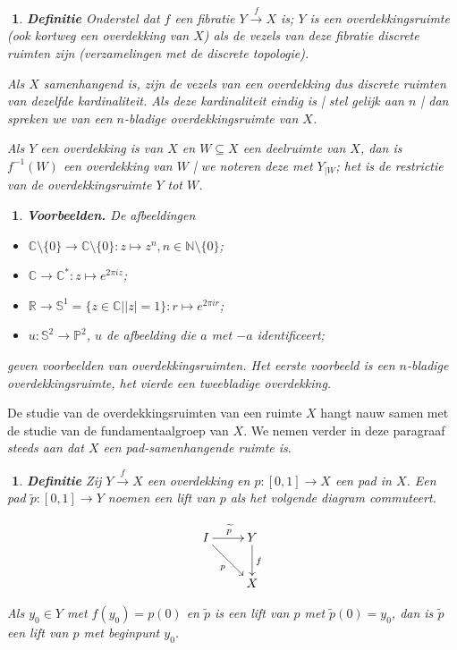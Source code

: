 \documentclass[12pt]{book}
\newcommand{\R}{\mathbb{R}}
\newcommand{\C}{\mathbb{C}}
\newtheorem{vbnh}[stelh]{$\!\!$}
\newenvironment{vbn}{\begin{vbnh} \em {\bf Voorbeelden.}}{\end{vbnh}}
\newtheorem{dfh}[stelh]{$\!\!$}
\newenvironment{df}{\begin{dfh} \em {\bf Definitie }}{\end{dfh}}
\begin{document}
\begin{df} Onderstel dat $f$ een fibratie $Y\stackrel{f}{\to} X$ is; $Y$ is een  {\em overdekkingsruimte} (ook kortweg een  {\em overdekking} van $X$) als de vezels van deze fibratie discrete ruimten  zijn (verzamelingen met de discrete topologie). 

Als $X$ samenhangend is, zijn de vezels van een overdekking dus discrete ruimten van dezelfde kardinaliteit. Als deze kardinaliteit eindig is | stel gelijk aan $n$ | dan spreken we van een $n$-{\em bladige overdekkingsruimte} van $X$.

Als $Y$ een overdekking is van $X$ en $W\subseteq X$ een deelruimte  van $X$, dan is $f^{-1}(W)$ een overdekking van $W$ | we noteren deze met $Y_{|W}$; het is de {\em restrictie} van de overdekkings\-ruimte $Y$ tot  $W$.
\end{df}

\begin{vbn} \label{overd} De afbeeldingen
\begin{itemize}
\item $\C\setminus\{0\} \to \C\setminus \{0\}: z\mapsto z^n, n\in \mathbb{N}\setminus\{0\}$;
\item $\C \to \C^{*}: z\mapsto e^{2\pi iz}$;
\item $\R \to\mathbb{S}^{1}= \{z\in \C||z|=1\}: r\mapsto e^{2\pi ir}$;
\item $u:\mathbb{S}^{2}\to \mathbb{P}^{2}$, $u$ de afbeelding die $a$ met $-a$ identificeert;
\end{itemize}
geven voorbeelden van overdekkingsruimten. Het eerste voorbeeld is een $n$-bladige overdek\-kingsruimte, het vierde een tweebladige overdekking.
\end{vbn}

De studie van de overdekkingsruimten van een ruimte $X$ hangt nauw samen met de studie van de fundamentaalgroep van $X$. 
We nemen verder in deze paragraaf {\em steeds aan dat $X$ een pad-samenhangende ruimte is}.

\begin{df} Zij $Y\stackrel{f}{\to} X$ een overdekking en $p:[0,1]\to X$ een pad in $X$. Een pad $\widetilde{p}:[0,1]\to Y$ noemen een  {\em lift} van $p$ als het volgende diagram commuteert.

$$\xymatrix{
I \ar[r]^{\widetilde{p}} \ar[rd]_p & Y \ar[d]^f \\
& X 
}$$


Als $y_0\in Y$ met $f(y_0)=p(0)$ en $\widetilde{p}$ is een lift van $p$ met $\widetilde{p}(0)=y_0$, dan is $\widetilde{p}$ een {\em lift} van $p$ met {\em beginpunt} $y_0$.
\end{df}
\end{document}

